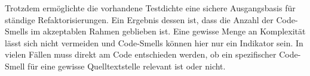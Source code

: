 Trotzdem ermöglichte die vorhandene Testdichte eine sichere Ausgangsbasis für ständige Refaktorisierungen. Ein Ergebnis dessen ist, dass die Anzahl der Code-Smells im akzeptablen Rahmen geblieben ist. Eine gewisse Menge an Komplexität lässt sich nicht vermeiden und Code-Smells können hier nur ein Indikator sein. In vielen Fällen muss direkt am Code entschieden werden, ob ein spezifischer Code-Smell für eine gewisse Quelltextstelle relevant ist oder nicht.
